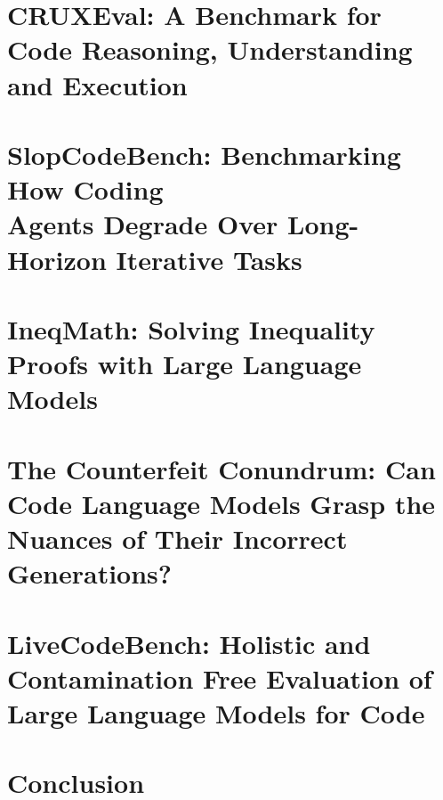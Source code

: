 \section{CRUXEval: A Benchmark for Code Reasoning, Understanding and Execution}
\label{sec:cruxeval-code-reasoning-understanding-execution-evaluation}


\section[SlopCodeBench: Benchmarking How Coding Agents Degrade Over Long-Horizon Iterative Tasks]{SlopCodeBench: Benchmarking How Coding\\ Agents Degrade Over Long-Horizon Iterative Tasks}
\label{sec:slopcodebench-right-metrics}



\section{IneqMath: Solving Inequality Proofs with Large Language Models}
\label{sec:ineqmath-right-metrics}



\section{The Counterfeit Conundrum: Can Code Language Models Grasp the Nuances of Their Incorrect Generations?}
\label{sec:counterfeit-conundrum}


\section{LiveCodeBench: Holistic and Contamination Free Evaluation of Large Language Models for Code}
\label{sec:livecodebench-right-metrics}


\section{Conclusion}

